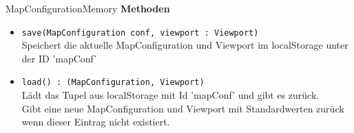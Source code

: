 \begin{Class}{MapConfigurationMemory}
    \textbf{Methoden}
    \begin{itemize}
        \item \texttt{save(MapConfiguration conf, viewport : Viewport)}
        \\ Speichert die aktuelle MapConfiguration und Viewport im localStorage unter der ID 'mapConf'
        \item \texttt{load() : (MapConfiguration, Viewport)}
        \\ Lädt das Tupel aus localStorage mit Id 'mapConf' und gibt es zurück.
        \\ Gibt eine neue MapConfiguration und Viewport mit Standardwerten zurück wenn 
        dieser Eintrag nicht existiert.
    \end{itemize}

\end{Class}